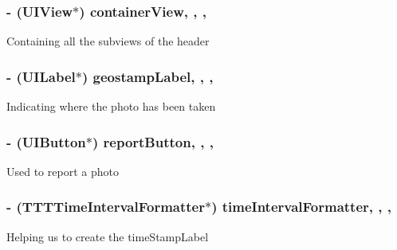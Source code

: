 \subsubsection[{container\+View}]{\setlength{\rightskip}{0pt plus 5cm}-\/ (U\+I\+View$\ast$) container\+View\hspace{0.3cm}{\ttfamily [read]}, {\ttfamily [write]}, {\ttfamily [nonatomic]}, {\ttfamily [strong]}}\label{category_e_s_photo_header_view_07_08_ad0a40fb661c1afa19f9f9899bdd7b57b}
Containing all the subviews of the header \hypertarget{category_e_s_photo_header_view_07_08_ad742bec5034c1f062fde5a5b8a053556}{}
\subsubsection[{geostamp\+Label}]{\setlength{\rightskip}{0pt plus 5cm}-\/ (U\+I\+Label$\ast$) geostamp\+Label\hspace{0.3cm}{\ttfamily [read]}, {\ttfamily [write]}, {\ttfamily [nonatomic]}, {\ttfamily [strong]}}\label{category_e_s_photo_header_view_07_08_ad742bec5034c1f062fde5a5b8a053556}
Indicating where the photo has been taken \hypertarget{category_e_s_photo_header_view_07_08_a04b87bebee468df2573aef2709e56c5e}{}
\subsubsection[{report\+Button}]{\setlength{\rightskip}{0pt plus 5cm}-\/ (U\+I\+Button$\ast$) report\+Button\hspace{0.3cm}{\ttfamily [read]}, {\ttfamily [write]}, {\ttfamily [nonatomic]}, {\ttfamily [strong]}}\label{category_e_s_photo_header_view_07_08_a04b87bebee468df2573aef2709e56c5e}
Used to report a photo \hypertarget{category_e_s_photo_header_view_07_08_a41b96cf21dece233aa8bb3a6602376e8}{}
\subsubsection[{time\+Interval\+Formatter}]{\setlength{\rightskip}{0pt plus 5cm}-\/ (T\+T\+T\+Time\+Interval\+Formatter$\ast$) time\+Interval\+Formatter\hspace{0.3cm}{\ttfamily [read]}, {\ttfamily [write]}, {\ttfamily [nonatomic]}, {\ttfamily [strong]}}\label{category_e_s_photo_header_view_07_08_a41b96cf21dece233aa8bb3a6602376e8}
Helping us to create the time\+Stamp\+Label \hypertarget{category_e_s_photo_header_view_07_08_a9e9e377aec46d409e2dc1bb144d20cc4}{}
